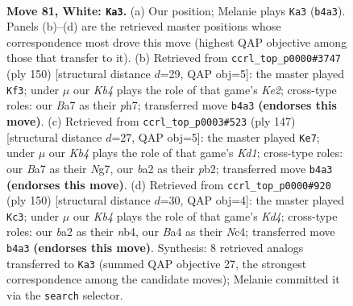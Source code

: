 \documentclass[11pt]{article}
\begin{document}
\clearpage

\begin{figure}[p]\centering
\begin{subfigure}{0.46\textwidth}\centering
\resizebox{\linewidth}{!}{%
\newchessgame
\chessboard[
  setfen={6k1/B1R5/4r3/8/BK2p2p/5p1P/b4P2/8 w - - 72 81},
  showmover=false,
  pgfstyle=straightmove, color=movearrow, markmove={b4-a3}
]}
\caption{}
\end{subfigure}\hfill
\begin{subfigure}{0.46\textwidth}\centering
\resizebox{\linewidth}{!}{%
\newchessgame
\chessboard[
  setfen={8/7p/3k2pP/4p1P1/4P3/4B1b1/4K3/8 w - - 14 76},
  showmover=false,
  pgfstyle=straightmove, color=movearrow, markmove={e2-f3}
]}
\caption{}
\end{subfigure}
\\[4pt]
\begin{subfigure}{0.46\textwidth}\centering
\resizebox{\linewidth}{!}{%
\newchessgame
\chessboard[
  setfen={3k4/3b1pn1/6p1/4P3/5P1P/5K2/1P6/2R5 b - - 30 74},
  showmover=false,
  pgfstyle=straightmove, color=movearrow, markmove={d8-e7}
]}
\caption{}
\end{subfigure}\hfill
\begin{subfigure}{0.46\textwidth}\centering
\resizebox{\linewidth}{!}{%
\newchessgame
\chessboard[
  setfen={8/1B5k/1B3pp1/7p/1nNK3P/6P1/8/r7 w - - 18 76},
  showmover=false,
  pgfstyle=straightmove, color=movearrow, markmove={d4-c3}
]}
\caption{}
\end{subfigure}
\caption{\textbf{Move 81, White: \texttt{Ka3}.} (a) Our position; Melanie plays \texttt{Ka3} (\texttt{b4a3}). Panels (b)--(d) are the retrieved master positions whose correspondence most drove this move (highest QAP objective among those that transfer to it). (b) Retrieved from \texttt{ccrl\_top\_p0000\#3747} (ply 150) [structural distance $d$=29, QAP obj=5]: the master played \texttt{Kf3}; under $\mu$ our \emph{Kb4} plays the role of that game's \emph{Ke2}; cross-type roles: our \emph{B}a7 as their \emph{p}h7; transferred move \texttt{b4a3} \textbf{(endorses this move)}. (c) Retrieved from \texttt{ccrl\_top\_p0003\#523} (ply 147) [structural distance $d$=27, QAP obj=5]: the master played \texttt{Ke7}; under $\mu$ our \emph{Kb4} plays the role of that game's \emph{Kd1}; cross-type roles: our \emph{B}a7 as their \emph{N}g7, our \emph{b}a2 as their \emph{p}b2; transferred move \texttt{b4a3} \textbf{(endorses this move)}. (d) Retrieved from \texttt{ccrl\_top\_p0000\#920} (ply 150) [structural distance $d$=30, QAP obj=4]: the master played \texttt{Kc3}; under $\mu$ our \emph{Kb4} plays the role of that game's \emph{Kd4}; cross-type roles: our \emph{b}a2 as their \emph{n}b4, our \emph{B}a4 as their \emph{N}c4; transferred move \texttt{b4a3} \textbf{(endorses this move)}. Synthesis: 8 retrieved analogs transferred to \texttt{Ka3} (summed QAP objective 27, the strongest correspondence among the candidate moves); Melanie committed it via the \texttt{search} selector.}
\label{fig:thought-m160}
\end{figure}
\end{document}
